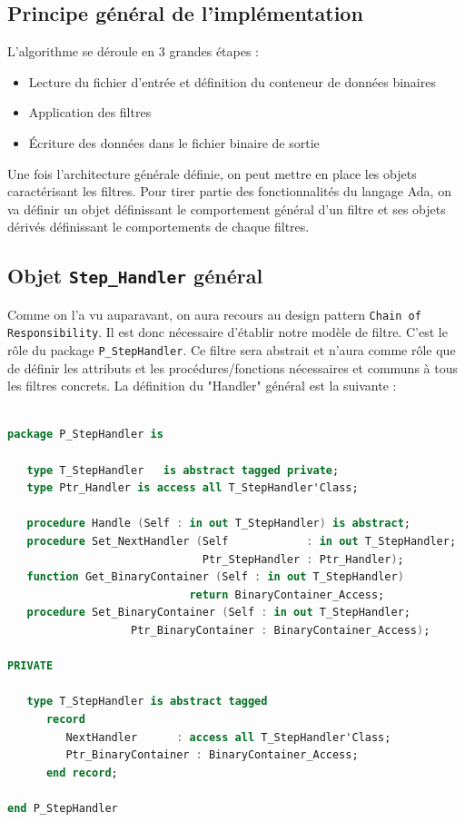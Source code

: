 \documentclass[a4paper]{article}
\begin{document}
\subsection{Principe général de l'implémentation}
L'algorithme se déroule en 3 grandes étapes : 
\begin{itemize}
\item Lecture du fichier d'entrée et définition du conteneur de données binaires
\item Application des filtres
\item Écriture des données dans le fichier binaire de sortie
\end{itemize}

Une fois l'architecture générale définie, on peut mettre en place les objets caractérisant les filtres. Pour tirer partie des fonctionnalités du langage Ada, on va définir un objet définissant le comportement général d'un filtre et ses objets dérivés définissant le comportements de chaque filtres.


\subsection{Objet \texttt{Step\_Handler} général}
Comme on l'a vu auparavant, on aura recours au design pattern \texttt{Chain of Responsibility}. Il est donc nécessaire d'établir notre modèle de filtre. C'est le rôle du package \texttt{P\_StepHandler}. Ce filtre sera abstrait et n'aura comme rôle que de définir les attributs et les procédures/fonctions nécessaires et communs à tous les filtres concrets. La définition du "Handler" général est la suivante :
\smallbreak
\begin{lstlisting}[language=ada]

package P_StepHandler is
   
   type T_StepHandler   is abstract tagged private;
   type Ptr_Handler is access all T_StepHandler'Class;
      
   procedure Handle (Self : in out T_StepHandler) is abstract;
   procedure Set_NextHandler (Self            : in out T_StepHandler;
                              Ptr_StepHandler : Ptr_Handler);
   function Get_BinaryContainer (Self : in out T_StepHandler) 
                            return BinaryContainer_Access;
   procedure Set_BinaryContainer (Self : in out T_StepHandler;
                   Ptr_BinaryContainer : BinaryContainer_Access);

PRIVATE

   type T_StepHandler is abstract tagged
      record
         NextHandler      : access all T_StepHandler'Class;
         Ptr_BinaryContainer : BinaryContainer_Access;
      end record;

end P_StepHandler
\end{lstlisting}
\end{document}
